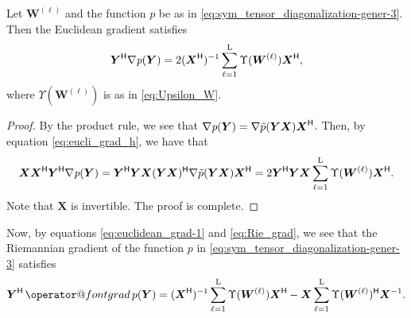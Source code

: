\documentclass[final,onefignum,onetabnum]{siamart190516}
\makeatletter
\newcommand{\matr}[1]{\boldsymbol{#1}}
\renewcommand{\H}{{\sf H}} %
\newcommand{\ProjGrad}[2]{\mathop{{\operator@font grad} }#1(#2)}
\newcommand{\matrelem}[1]{\mathrm{#1}}
\renewcommand{\H}{{\sf H}}      %
\makeatother
\begin{document}
\begin{lemma}\label{eq:encli_grad_p}
Let $\matr{W}^{(\ell)}$ and the function $p$ be as in  \cref{eq:sym_tensor_diagonalization-gener-3}. Then
the Euclidean gradient satisfies
\begin{align}
\matr{Y}^{\H}\nabla\textit{p}(\matr{Y}) =  2(\matr{X}^{\H})^{-1}\sum_{\ell=1}^{\matrelem{L}}\Upsilon(\matr{W}^{(\ell)})\matr{X}^{\H},\label{eq:euclidean_grad-1}
\end{align}
where $\Upsilon(\matr{W}^{(\ell)})$ is as in \cref{eq:Upsilon_W}. 
\end{lemma}
\begin{proof}
By the product rule, we see that
$\nabla\textit{p}(\matr{Y})=\nabla\tilde{p}(\matr{Y}\matr{X})\matr{X}^{\H}$. 
Then, by equation \cref{eq:eucli_grad_h}, we have that 
\begin{align*}
\matr{X}\matr{X}^{\H}\matr{Y}^{\H}\nabla\textit{p}(\matr{Y}) = \matr{Y}^{\H}\matr{Y}\matr{X}(\matr{Y}\matr{X})^{\H}\nabla\tilde{p}(\matr{Y}\matr{X})\matr{X}^{\H}=
2\matr{Y}^{\H}\matr{Y}\matr{X}\sum_{\ell=1}^{\matrelem{L}}\Upsilon(\matr{W}^{(\ell)})\matr{X}^{\H}.
\end{align*}
Note that $\matr{X}$ is invertible. The proof is complete. 
\end{proof}

Now, by equations \cref{eq:euclidean_grad-1} and \cref{eq:Rie_grad}, we see that the Riemannian gradient of the function $p$ in \cref{eq:sym_tensor_diagonalization-gener-3} satisfies 
\begin{align}\label{eq:riem_grad_p}
\matr{Y}^{\H}\ProjGrad{p}{\matr{Y}} 
= (\matr{X}^{\H})^{-1}\sum_{\ell=1}^{\matrelem{L}}\Upsilon(\matr{W}^{(\ell)})\matr{X}^{\H} - \matr{X}\sum_{\ell=1}^{\matrelem{L}}\Upsilon(\matr{W}^{(\ell)})^{\H}\matr{X}^{-1}.
\end{align}
\end{document}
